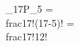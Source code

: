 \documentclass[preview]{standalone}
\begin{document}
\begin{center}
{}_{17}P_{5} = \\frac{17!}{(17-5)!} = \\frac{17!}{12!}
\end{center}
\end{document}
